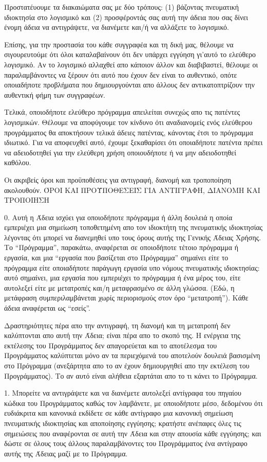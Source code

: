 \begin{small}
Προστατέυουμε τα διακαιώματα σας με δύο τρόπους: (1) βάζοντας πνευματική ιδιοκτησία στο λογισμικό και (2) προσφέροντάς σας αυτή την άδεια που σας δίνει ένομη άδεια να αντιγράψετε, να διανέμετε και/ή να αλλάξετε το λογισμικό.

Επίσης, για την προστασία του κάθε συγγραφέα και τη δική μας, θέλουμε να σιγουρευτούμε ότι όλοι καταλαβαίνουν ότι δεν υπάρχει εγγύηση γι'αυτό το ελεύθερο λογισμικό. Αν το λογισμικό αλλαχθεί απο κάποιον άλλον και διαβιβαστεί, θέλουμε οι παραλαμβάνοντες να ξέρουν ότι αυτό που έχουν δεν είναι το αυθεντικό, οπότε οποιαδήποτε προβλήματα που δημιουργούνται απο άλλους δεν αντικατοπτρίζουν την αυθεντική φήμη των συγγραφέων.

Τελικά, οποιοδήποτε ελεύθερο πρόγραμμα απειλείται συνεχώς απο τις πατέντες λογισμικών. Θέλουμε να αποφύγουμε τον κίνδυνο ότι αναδιανομείς ενός ελεύθερου προγράμματος θα αποκτήσουν τελικά άδειες πατέντας, κάνοντας έτσι το πρόγραμμα ιδιωτικό. Για να αποφευχθεί αυτό, έχουμε ξεκαθαρίσει ότι οποιαδήποτε πατέντα πρέπει να αδειοδοτηθεί για την ελεύθερη χρήση οποιουδήποτε ή να μην αδειοδοτηθεί καθόλου.

Οι ακριβείς όροι και προϋποθέσεις για αντιγραφή, διανομή και τροποποίηση ακολουθούν. ΌΡΟΙ ΚΑΙ ΠΡΟΫΠΟΘΕΣΕΙΣ ΓΙΑ ΑΝΤΙΓΡΑΦΗ, ΔΙΑΝΟΜΗ ΚΑΙ ΤΡΟΠΟΙΗΣΗ

0. Αυτή η Άδεια ισχύει για οποιοδήποτε πρόγραμμα ή άλλη δουλειά η οποία εμπεριέχει μια σημείωση τοποθετημένη απο τον  ιδιοκτήτη της πνευματικής ιδιοκτησίας λέγοντας ότι μπορεί να διανεμηθεί υπο τους όρους αυτής της Γενικής Άδειας Χρήσης. Το “Πρόγραμμα”, παρακάτω, αναφέρεται σε οποιοδήποτε τέτοιο πρόγραμμα ή εργασία, και μια “εργασία που βασίζεται στο Πρόγραμμα” σημαίνει είτε το πρόγραμμα είτε οποιαδήποτε παράγωγη εργασία υπο νόμους πνευματικής ιδιοκτησίας: αυτό σημαίνει, μια εργασία που εμπεριέχει το πρόγραμμα ή ένα μέρος του, είτε αυτολεξεί είτε με μετατροπές και/η μεταφρασμένο σε άλλη γλώσσα. (Εδώ, η μετάφραση συμπεριλαμβάνεται χωρίς περιορισμούς στον όρο “μετατροπή”). Κάθε άδεια αναφέρεται ως “εσείς”.

Δραστηριότητες πέρα απο την αντιγραφή, τη διανομή και τη μετατροπή δεν καλύπτονται απο αυτή την Άδεια; είναι πέρα απο το σκοπό της. Η ενέργεια της εκτέλεσης του Προγράμματος δεν απαγορεύεται και το αποτέλεσμα του Προγράμματος καλύπτεται μόνο αν τα περιεχόμενά του αποτελούν δουλειά βασισμένη στο Πρόγραμμα (ανεξάρτητα απο το αν έχουν δημιουργηθεί απο την εκτέλεση του Προγράμματος). Το αν αυτό είναι αλήθεια εξαρτάται απο το τι κάνει το Πρόγραμμα.

1. Μπορείτε να αντιγράψετε και να διανέμετε αυτολεξεί αντίγραφα του πηγαίου κώδικα του Προγράμματος καθώς τον λαμβάνετε, με οποιοδήποτε μέσο, δεδομένου ότι ευδιάκριτα και κανονικά εκδίδετε σε κάθε αντίγραφο μια κανονική σημείωση πνευματικής ιδιοκτησίας και αποποίησης εγγύησης; κρατήστε ανέπαφες όλες τις σημειώσεις που αναφέρονται σε αυτή την Άδεια και στην απουσία κάθε εγγύησης; και δώστε σε όλους τους άλλους παραλαμβάνοντες του Προγράμματος ένα αντίγραφο αυτής της Άδειας μαζί με το Πρόγραμμα.


\end{small}
